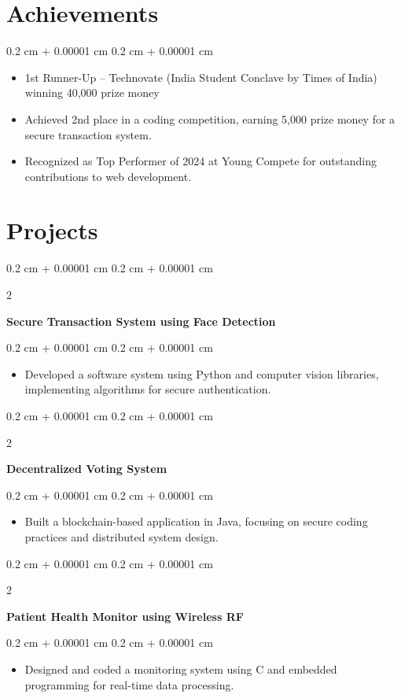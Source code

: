 \documentclass[10pt, letterpaper]{article}
\newenvironment{highlights}{
    \begin{itemize}[
        topsep=0.10 cm,
        parsep=0.10 cm,
        partopsep=0pt,
        itemsep=0pt,
        leftmargin=0.4 cm + 10pt
    ]
}{
    \end{itemize}
} %
\newenvironment{onecolentry}{
    \begin{adjustwidth}{
        0.2 cm + 0.00001 cm
    }{
        0.2 cm + 0.00001 cm
    }
}{
    \end{adjustwidth}
} %
\newenvironment{twocolentry}[2][]{
    \onecolentry
    \def\secondColumn{#2}
    \setcolumnwidth{\fill, 4.5 cm}
    \begin{paracol}{2}
}{
    \switchcolumn \raggedleft \secondColumn
    \end{paracol}
    \endonecolentry
} %
\begin{document}
    \section{Achievements}
    \begin{onecolentry}
        \begin{highlights}
            \item 1st Runner-Up – Technovate (India Student Conclave by Times of India) winning 40,000 prize money 
            \item Achieved 2nd place in a coding competition, earning 5,000 prize money for a secure transaction system.
            \item Recognized as Top Performer of 2024 at Young Compete for outstanding contributions to web development.
        \end{highlights}
    \end{onecolentry}

    \section{Projects}
    \begin{twocolentry}{}
        \textbf{Secure Transaction System using Face Detection}
    \end{twocolentry}
    \vspace{0.10 cm}
    \begin{onecolentry}
        \begin{highlights}
            \item Developed a software system using Python and computer vision libraries, implementing algorithms for secure authentication.
        \end{highlights}
    \end{onecolentry}

    \vspace{0.2 cm}
    \begin{twocolentry}{}
        \textbf{Decentralized Voting System}
    \end{twocolentry}
    \vspace{0.10 cm}
    \begin{onecolentry}
        \begin{highlights}
            \item Built a blockchain-based application in Java, focusing on secure coding practices and distributed system design.
        \end{highlights}
    \end{onecolentry}

    \vspace{0.2 cm}
    \begin{twocolentry}{}
        \textbf{Patient Health Monitor using Wireless RF}
    \end{twocolentry}
    \vspace{0.10 cm}
    \begin{onecolentry}
        \begin{highlights}
            \item Designed and coded a monitoring system using C and embedded programming for real-time data processing.
        \end{highlights}
    \end{onecolentry}
\end{document}
